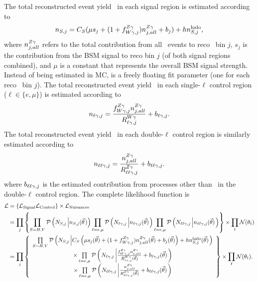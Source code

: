 The total reconstructed event yield \nS\ in each signal region is estimated according to
\begin{equation}
  \nS[,j] = C_{S} (\mu s_{j} + (1 + \fZW[,j])\nZg[j,all] + b_{j}) + h\nhalo[,j],
\end{equation}
where $\nZg[j,all]$ refers to the total contribution from all \zinvg\ events to reco \ETgamma\ bin $j$, $s_{j}$ is the contribution from the BSM
signal to reco bin $j$ (of both signal regions combined), and $\mu$ is a constant that represents the overall BSM signal strength.
Instead of being estimated in MC, \nZg[j,all] is a freely floating fit parameter (one for each reco \ETgamma\ bin $j$).
The total reconstructed event yield \nl\ in each single-$\ell$ control region ($\ell \in \{e,\mu\}$) is estimated according to
\begin{equation}
  \nl[,j] = \frac{\fZW[,j]\nZg[j,all]}{\RWl[,j]} + b_{\ell\Pgamma,j}.
\end{equation}
The total reconstructed event yield \nll\ in each double-$\ell$ control region is similarly estimated according to
\begin{equation}
  \nll[,j] = \frac{\nZg[j,all]}{\RZll[,j]} + b_{\ell\ell\Pgamma,j}.
\end{equation}
where $b_{\ell\ell\Pgamma,j}$ is the estimated contribution from processes other than \zllg\ in the double-$\ell$ control region.
The complete likelihood function is
\begin{align}
  \mathcal{L} & = \left\{ \mathcal{L_{\text{Signal}}} \mathcal{L_{\text{Control}}} \right\} \times \mathcal{L_{\text{Nuisances}}} \\
  & = \prod_{j} \left\{
    \prod_{S=H,V} \mathcal{P}\left( N_{S, j} \left| \nS[,j] (\vec{\theta} \right.) \right)
     \prod_{\ell=\Pe,\Pmu} \mathcal{P}\left( N_{\ell\Pgamma, j} \left| \nl[,j] (\vec{\theta}) \right. \right)
      \prod_{\ell=\Pe,\Pmu} \mathcal{P}\left( N_{\ell\ell\Pgamma, j} \left| \nll[,j] (\vec{\theta}) \right. \right) 
    \right\}  \times \prod_{t} \mathcal{N}(\theta_t) \\
  & = \prod_{j} \left\{
  \begin{array}{cc}
    \prod\limits_{S=H,V} \mathcal{P}\left( N_{S, j} \left| C_{S} \left(\mu s_{j}(\vec{\theta}) + (1 + \fZW[,j])\nZg[j,all](\vec{\theta}) + b_{j}(\vec{\theta})\right) + h \nhalo[,j](\vec{\theta}) \right. \right) \\[1.3pt]
    \times \prod\limits_{\ell=\Pe,\Pmu} \mathcal{P}\left( N_{\ell\Pgamma, j} \left| \frac{\fZW[,j]\nZg[j,all]}{\RWl[,j](\vec{\theta})} + b_{\ell\Pgamma, j}(\vec{\theta}) \right. \right) \\[1.3pt]
    \times \prod\limits_{\ell=\Pe,\Pmu} \mathcal{P}\left( N_{\ell\ell\Pgamma, j} \left| \frac{\nZg[j,all]}{\RZll[,j](\vec{\theta})} + b_{\ell\ell\Pgamma, j}(\vec{\theta}) \right. \right) \\[1.3pt]
  \end{array} \right\}
  \times \prod_{t} \mathcal{N}(\theta_t).
\end{align}

